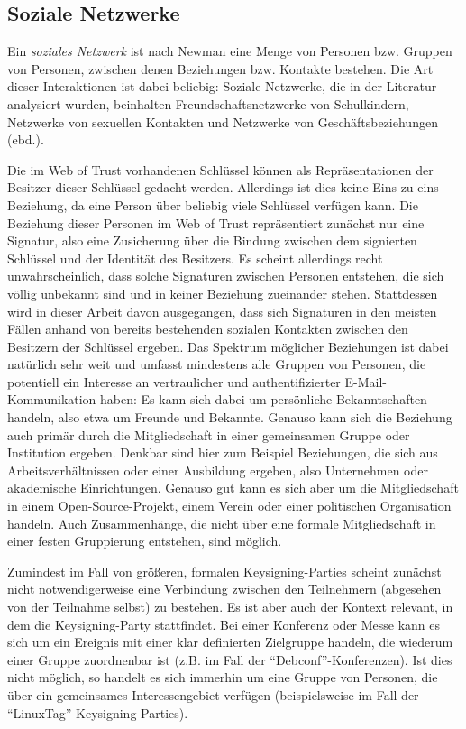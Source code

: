 \subsection{Soziale Netzwerke}
\label{sec:soziale-netzwerke}

Ein \emph{soziales Netzwerk} ist nach Newman\cite{newman:167} eine
Menge von Personen bzw. Gruppen von Personen, zwischen denen
Beziehungen bzw. Kontakte bestehen. Die Art dieser Interaktionen ist
dabei beliebig: Soziale Netzwerke, die in der Literatur analysiert
wurden, beinhalten Freundschaftsnetzwerke von Schulkindern, Netzwerke
von sexuellen Kontakten und Netzwerke von Geschäftsbeziehungen
(ebd.).

Die im Web of Trust vorhandenen Schlüssel können als
Repräsentationen der Besitzer dieser Schlüssel gedacht
werden. Allerdings ist dies keine Eins-zu-eins-Beziehung, da eine
Person über beliebig viele Schlüssel verfügen kann. Die
Beziehung dieser Personen im Web of Trust repräsentiert zunächst
nur eine Signatur, also eine Zusicherung über die Bindung zwischen
dem signierten Schlüssel und der Identität des Besitzers. Es
scheint allerdings recht unwahrscheinlich, dass solche Signaturen
zwischen Personen entstehen, die sich völlig unbekannt sind und in
keiner Beziehung zueinander stehen. Stattdessen wird in dieser Arbeit
davon ausgegangen, dass sich Signaturen in den meisten Fällen anhand
von bereits bestehenden sozialen Kontakten zwischen den Besitzern der
Schlüssel ergeben\cite{Capkun2002}. Das Spektrum möglicher
Beziehungen ist dabei natürlich sehr weit und umfasst mindestens
alle Gruppen von Personen, die potentiell ein Interesse an
vertraulicher und authentifizierter E-Mail-Kommunikation haben: Es
kann sich dabei um persönliche Bekanntschaften handeln, also etwa um
Freunde und Bekannte. Genauso kann sich die Beziehung auch primär
durch die Mitgliedschaft in einer gemeinsamen Gruppe oder Institution
ergeben. Denkbar sind hier zum Beispiel Beziehungen, die sich aus
Arbeitsverhältnissen oder einer Ausbildung ergeben, also Unternehmen
oder akademische Einrichtungen. Genauso gut kann es sich aber um die
Mitgliedschaft in einem Open-Source-Projekt, einem Verein oder einer
politischen Organisation handeln. Auch Zusammenhänge, die nicht
über eine formale Mitgliedschaft in einer festen Gruppierung
entstehen, sind möglich.

Zumindest im Fall von größeren, formalen Keysigning-Parties scheint
zunächst nicht notwendigerweise eine Verbindung zwischen den
Teilnehmern (abgesehen von der Teilnahme selbst) zu bestehen. Es ist
aber auch der Kontext relevant, in dem die Keysigning-Party
stattfindet. Bei einer Konferenz oder Messe kann es sich um ein
Ereignis mit einer klar definierten Zielgruppe handeln, die wiederum
einer Gruppe zuordnenbar ist (z.B. im Fall der
``Debconf''-Konferenzen). Ist dies nicht möglich, so handelt es sich
immerhin um eine Gruppe von Personen, die über ein gemeinsames
Interessengebiet verfügen (beispielsweise im Fall der
``LinuxTag''-Keysigning-Parties).

